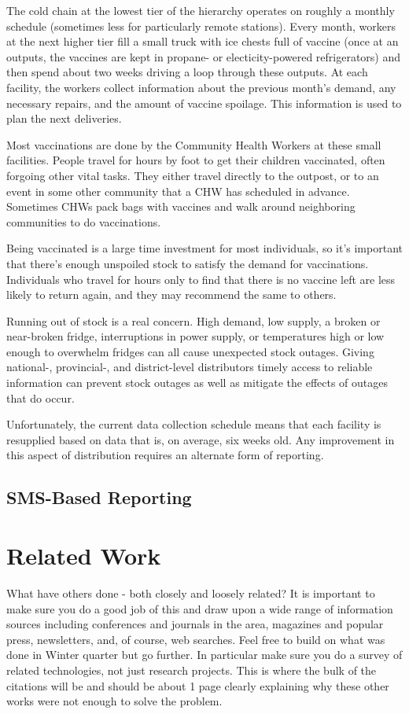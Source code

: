 \documentclass{acm_proc_article-sp}
\begin{document}
The cold chain at the lowest tier of the hierarchy operates on roughly a monthly schedule (sometimes less for particularly remote stations). Every month, workers at the next higher tier fill a small truck with ice chests full of vaccine (once at an outputs, the vaccines are kept in propane- or electicity-powered refrigerators) and then spend about two weeks driving a loop through these outputs. At each facility, the workers collect information about the previous month's demand, any necessary repairs, and the amount of vaccine spoilage. This information is used to plan the next deliveries. 

Most vaccinations are done by the Community Health Workers at these small facilities. People travel for hours by foot to get their children vaccinated, often forgoing other vital tasks. They either travel directly to the outpost, or to an event in some other community that a CHW has scheduled in advance. Sometimes CHWs pack bags with vaccines and walk around neighboring communities to do vaccinations. 

Being vaccinated is a large time investment for most individuals, so it's important that there's enough unspoiled stock to satisfy the demand for vaccinations. Individuals who travel for hours only to find that there is no vaccine left are less likely to return again, and they may recommend the same to others. 

Running out of stock is a real concern. High demand, low supply, a broken or near-broken fridge, interruptions in power supply, or temperatures high or low enough to overwhelm fridges can all cause unexpected stock outages. Giving national-, provincial-, and district-level distributors timely access to reliable information can prevent stock outages as well as mitigate the effects of outages that do occur. 

Unfortunately, the current data collection schedule means that each facility is resupplied based on data that is, on average, six weeks old. Any improvement in this aspect of distribution requires an alternate form of reporting. 

\subsection{SMS-Based Reporting}

\section{Related Work}
What have others done - both closely and loosely related?  It is important to make sure you do a good job of this and draw upon a wide range of information sources including conferences and journals in the area, magazines and popular press, newsletters, and, of course, web searches.  Feel free to build on what was done in Winter quarter but go further.  In particular make sure you do a survey of related technologies, not just research projects.  This is where the bulk of the citations will be and should be about 1 page clearly explaining why these other works were not enough to solve the problem.
\end{document}
